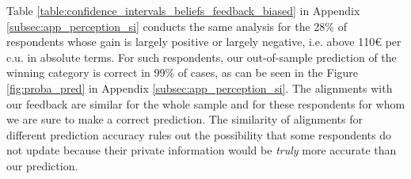 \documentclass[12pt]{article} %
\begin{document}
Table \ref{table:confidence_intervals_beliefs_feedback_biased} in Appendix \ref{subsec:app_perception_si} conducts the same analysis for the 28\% of respondents whose gain is largely positive or largely negative, i.e. above 110\euro{} per c.u. in absolute terms. For such respondents, our out-of-sample prediction of the winning category is correct in 99\% of cases, as can be seen in the Figure \ref{fig:proba_pred} in Appendix \ref{subsec:app_perception_si}. The alignments with our feedback are similar for the whole sample and for these respondents for whom we are sure to make a correct prediction. The similarity of alignments for different prediction accuracy rules out the possibility that some respondents do not update because their private information would be \textit{truly} more accurate than our prediction.
\end{document}
